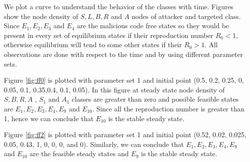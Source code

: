 We plot a curve to understand the behavior of the classes with time. Figures show the node density of $S,L,B,R$ and $A$ nodes of attacker and targeted class. Since $E_{1}, E_{2},E_{3}$ and $E_{4}$ are the malicious code free states so they would be present in every set of equilibrium states if their reproduction number $R_{0}<1$, otherwise equilibrium will tend to some other states if their $R_{0}>1$. All observations are done with respect to the time and by using different parameter sets.

\noindent Figure \ref{fig:ff0} is plotted with parameter set 1 and initial point (0.5, 0.2, 0.25, 0, 0.05, 0.1, 0.35,0.4, 0.1, 0.05). In this figure at steady state node density of $S, B, R, A$ , $S_{1}$ and $A_{1}$ classes are greater than zero and possible feasible states are $E_{1}, E_{2}, E_{3}, E_{4}, E_{9}$ and $E_{10}$. Since all the reproduction number is greater than 1, hence we can conclude that $E_{10}$ is the stable steady state.

\noindent Figure \ref{fig:ff2} is plotted with parameter set 1 and initial point (0.52, 0.02, 0.025, 0.05, 0.43, 1, 0, 0, 0, and 0). Similarly, we can conclude that $E_{1}, E_{2}, E_{3}, E_{4}, E_{9}$ and $E_{10}$ are the feasible steady states and $E_{9}$ is the stable steady state.

